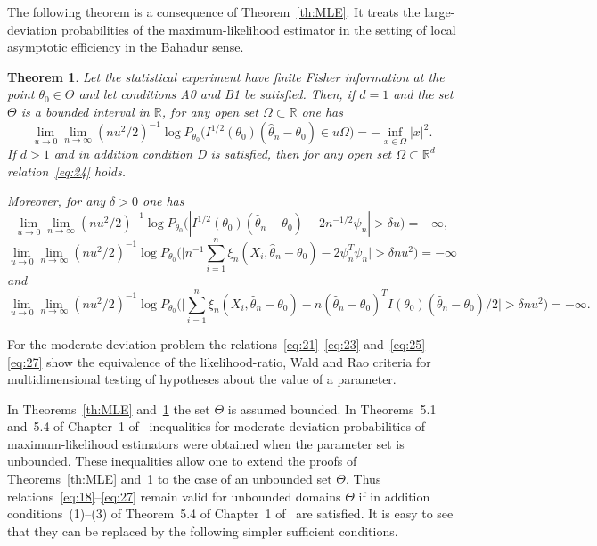 \documentclass[11pt,a4paper]{article}
\newtheorem{theorem}{Theorem}[section]
\begin{document}
The following theorem is a consequence of Theorem~\ref{th:MLE}. It treats the large-deviation probabilities of the maximum-likelihood estimator in the setting of local asymptotic efficiency in the Bahadur sense.

\begin{theorem}\label{th:MLE-Bahadur}
Let the statistical experiment have finite Fisher information at the point $\theta_0\in\Theta$ and let conditions A0 and B1 be satisfied. Then, if $d=1$ and the set $\Theta$ is a bounded interval in $\mathbb{R}$, for any open set $\Omega\subset\mathbb{R}$ one has
\begin{equation}
\lim_{u\to 0}\lim_{n\to\infty}(nu^2/2)^{-1}\log P_{\theta_0}\bigl(I^{1/2}(\theta_0)(\hat\theta_n-\theta_0)\in u\Omega\bigr)=-\inf_{x\in\Omega}|x|^2.
\label{eq:24}
\end{equation}
If $d>1$ and in addition condition D is satisfied, then for any open set $\Omega\subset\mathbb{R}^d$ relation~\eqref{eq:24} holds.

Moreover, for any $\delta>0$ one has
\begin{equation}
\lim_{u\to 0}\lim_{n\to\infty}(nu^2/2)^{-1}\log P_{\theta_0}\bigl(|I^{1/2}(\theta_0)(\hat\theta_n-\theta_0)-2n^{-1/2}\psi_n|>\delta u\bigr)=-\infty,
\label{eq:25}
\end{equation}
\begin{equation}
\lim_{u\to 0}\lim_{n\to\infty}(nu^2/2)^{-1}\log P_{\theta_0}\Biggl(
\Biggl|n^{-1}\sum_{i=1}^n\xi_n(X_i,\hat\theta_n-\theta_0)-2\psi_n^T\psi_n\Biggr|>\delta nu^2\Biggr)=-\infty
\label{eq:26}
\end{equation}
and
\begin{equation}
\lim_{u\to 0}\lim_{n\to\infty}(nu^2/2)^{-1}\log P_{\theta_0}\Biggl(
\Biggl|\sum_{i=1}^n\xi_n(X_i,\hat\theta_n-\theta_0)
-n(\hat\theta_n-\theta_0)^T I(\theta_0)(\hat\theta_n-\theta_0)/2\Biggr|>\delta nu^2\Biggr)=-\infty.
\label{eq:27}
\end{equation}
\end{theorem}

For the moderate-deviation problem the relations~\eqref{eq:21}--\eqref{eq:23} and~\eqref{eq:25}--\eqref{eq:27} show the equivalence of the likelihood-ratio, Wald and Rao criteria for multidimensional testing of hypotheses about the value of a parameter.

In Theorems~\ref{th:MLE} and~\ref{th:MLE-Bahadur} the set $\Theta$ is assumed bounded. In Theorems~5.1 and~5.4 of Chapter~1 of~\cite{10} inequalities for moderate-deviation probabilities of maximum-likelihood estimators were obtained when the parameter set is unbounded. These inequalities allow one to extend the proofs of Theorems~\ref{th:MLE} and~\ref{th:MLE-Bahadur} to the case of an unbounded set $\Theta$. Thus relations~\eqref{eq:18}--\eqref{eq:27} remain valid for unbounded domains $\Theta$ if in addition conditions~(1)--(3) of Theorem~5.4 of Chapter~1 of~\cite{10} are satisfied. It is easy to see that they can be replaced by the following simpler sufficient conditions.
\end{document}
